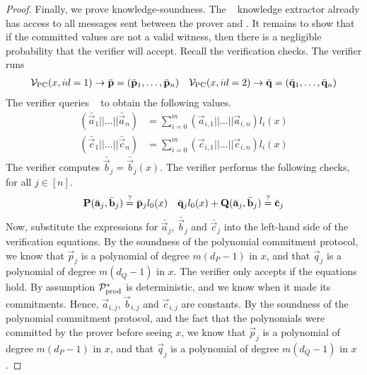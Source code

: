 \begin{proof}
Finally, we prove knowledge-soundness. The \ILC~ knowledge extractor already has access to all messages sent between the prover and \ILC. It remains to show that if the committed values are not a valid witness, then there is a negligible probability that the verifier will accept.
Recall the verification checks. The verifier runs
\begin{align*}
\mathcal{V}_\mathrm{PC}(x,id=1) \to \bar{\mathbf{p}}=(\bar{\mathbf{p}}_1,\ldots,\bar{\mathbf{p}}_n) &&
\mathcal{V}_\mathrm{PC}(x,id=2) \to \bar{\mathbf{q}}=(\bar{\mathbf{q}}_1,\ldots,\bar{\mathbf{q}}_n)
\end{align*}
The verifier queries \ILC~ to obtain the following values.
\begin{align*}
(\bar{\vec{a}}_1||\ldots||\bar{\vec{a}}_n) &= \sum_{i=0}^m ( \vec{a}_{i,1}||\ldots||\vec{a}_{i,n}) {l_i(x)} \\
(\bar{\vec{c}}_1||\ldots||\bar{\vec{c}}_n) &= \sum_{i=0}^m ( \vec{c}_{i,1}||\ldots||\vec{c}_{i,n}) {l_i(x)}
\end{align*}
The verifier computes $\bar{\vec{b}}_j=\bar{\vec{b}}_j(x)$. The verifier performs the following checks, for all $j \in [n]$.
\begin{align*}
\mathbf{P}(\bar{\mathbf{a}}_j,\bar{\mathbf{b}}_j) \overset{?}{=} \bar{\mathbf{p}}_jl_0(x) &&
\bar{\mathbf{q}}_jl_0(x)+\mathbf{Q}(\bar{\mathbf{a}}_j,\bar{\mathbf{b}}_j) \overset{?}{=} \bar{\mathbf{c}}_j
\end{align*}
Now, substitute the expressions for $\bar{\vec{a}}_j$, $\bar{\vec{b}}_j$ and $\bar{\vec{c}}_j$ into the left-hand side of the verification equations. By the soundness of the polynomial commitment protocol, we know that $\vec{p}_j$ is a polynomial of degree $m (d_P-1)$ in $x$, and that $\vec{q}_j$ is a polynomial of degree $m(d_Q-1)$ in $x$. The verifier only accepts if the equations hold. By assumption $\mathcal{P}^*_{\textnormal{prod}}$ is deterministic, and we know when it made its commitments. Hence, $\vec{a}_{i,j}$, $\vec{b}_{i,j}$ and $\vec{c}_{i,j}$ are constants. By the soundness of the polynomial commitment protocol, and the fact that the polynomials were committed by the prover before seeing $x$, we know that $\vec{p}_j$ is a polynomial of degree $m (d_P-1)$ in $x$, and that $\vec{q}_j$ is a polynomial of degree $m(d_Q-1)$ in $x$.


\end{proof}
